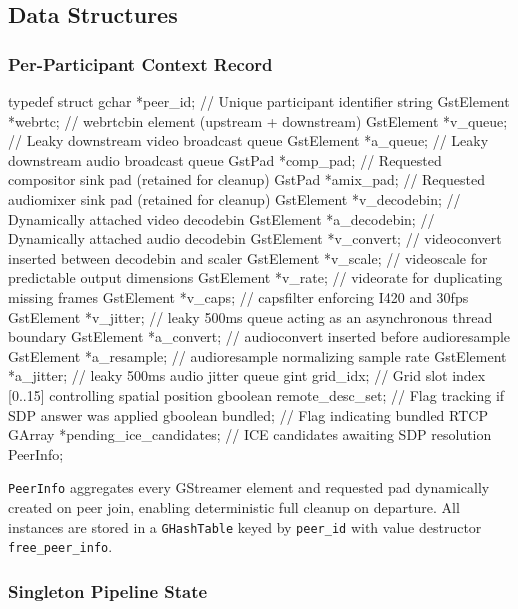 \documentclass{article}
\let\originalfootnotesize\footnotesize
\let\oldverbatim\verbatim
\let\oldendverbatim\endverbatim
\renewenvironment{verbatim}{\originalfootnotesize\oldverbatim}{\oldendverbatim}
\begin{document}
\subsection{Data Structures}

\subsubsection{Per-Participant Context Record}

\begin{verbatim}
typedef struct {
    gchar      *peer_id;      // Unique participant identifier string
    GstElement *webrtc;       // webrtcbin element (upstream + downstream)
    GstElement *v_queue;      // Leaky downstream video broadcast queue
    GstElement *a_queue;      // Leaky downstream audio broadcast queue
    GstPad     *comp_pad;     // Requested compositor sink pad (retained for cleanup)
    GstPad     *amix_pad;     // Requested audiomixer sink pad (retained for cleanup)
    GstElement *v_decodebin;  // Dynamically attached video decodebin
    GstElement *a_decodebin;  // Dynamically attached audio decodebin
    GstElement *v_convert;    // videoconvert inserted between decodebin and scaler
    GstElement *v_scale;      // videoscale for predictable output dimensions
    GstElement *v_rate;       // videorate for duplicating missing frames
    GstElement *v_caps;       // capsfilter enforcing I420 and 30fps
    GstElement *v_jitter;     // leaky 500ms queue acting as an asynchronous thread boundary
    GstElement *a_convert;    // audioconvert inserted before audioresample
    GstElement *a_resample;   // audioresample normalizing sample rate
    GstElement *a_jitter;     // leaky 500ms audio jitter queue
    gint        grid_idx;               // Grid slot index [0..15] controlling spatial position
    gboolean    remote_desc_set;        // Flag tracking if SDP answer was applied
    gboolean    bundled;                // Flag indicating bundled RTCP
    GArray     *pending_ice_candidates; // ICE candidates awaiting SDP resolution
} PeerInfo;
\end{verbatim}

\texttt{PeerInfo} aggregates every GStreamer element and requested pad dynamically created
on peer join, enabling deterministic full cleanup on departure. All instances are
stored in a \texttt{GHashTable} keyed by \texttt{peer\_id} with value destructor \texttt{free\_peer\_info}.

\subsubsection{Singleton Pipeline State}
\end{document}
